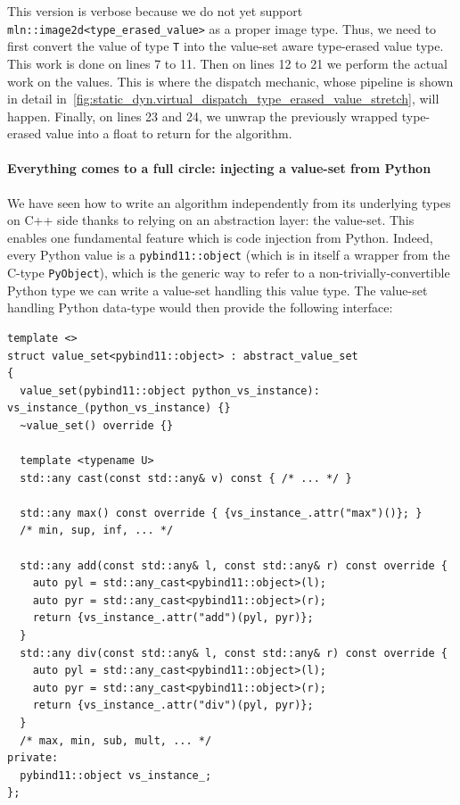 This version is verbose because we do not yet support \texttt{mln::image2d<type\_erased\_value>} as a proper image type.
Thus, we need to first convert the value of type \texttt{T} into the value-set aware type-erased value type. This work is
done on lines 7 to 11. Then on lines 12 to 21 we perform the actual work on the values. This is where the dispatch
mechanic, whose pipeline is shown in detail in~\cref{fig:static_dyn.virtual_dispatch_type_erased_value_stretch}, will
happen. Finally, on lines 23 and 24, we unwrap the previously wrapped type-erased value into a float to return for the
algorithm.


\paragraph{Everything comes to a full circle: injecting a value-set from Python}

We have seen how to write an algorithm independently from its underlying types on C++ side thanks to relying on an
abstraction layer: the value-set. This enables one fundamental feature which is code injection from Python. Indeed,
every Python value is a \texttt{pybind11::object} (which is in itself a wrapper from the C-type \texttt{PyObject}),
which is the generic way to refer to a non-trivially-convertible Python type we can write a value-set handling this
value type. The value-set handling Python data-type would then provide the following interface:

\begin{verbatim}
template <>
struct value_set<pybind11::object> : abstract_value_set
{
  value_set(pybind11::object python_vs_instance): vs_instance_(python_vs_instance) {}
  ~value_set() override {}

  template <typename U>
  std::any cast(const std::any& v) const { /* ... */ }

  std::any max() const override { {vs_instance_.attr("max")()}; }
  /* min, sup, inf, ... */

  std::any add(const std::any& l, const std::any& r) const override {
    auto pyl = std::any_cast<pybind11::object>(l);
    auto pyr = std::any_cast<pybind11::object>(r);
    return {vs_instance_.attr("add")(pyl, pyr)};
  }
  std::any div(const std::any& l, const std::any& r) const override {
    auto pyl = std::any_cast<pybind11::object>(l);
    auto pyr = std::any_cast<pybind11::object>(r);
    return {vs_instance_.attr("div")(pyl, pyr)};
  }
  /* max, min, sub, mult, ... */
private:
  pybind11::object vs_instance_;
};
\end{verbatim}

